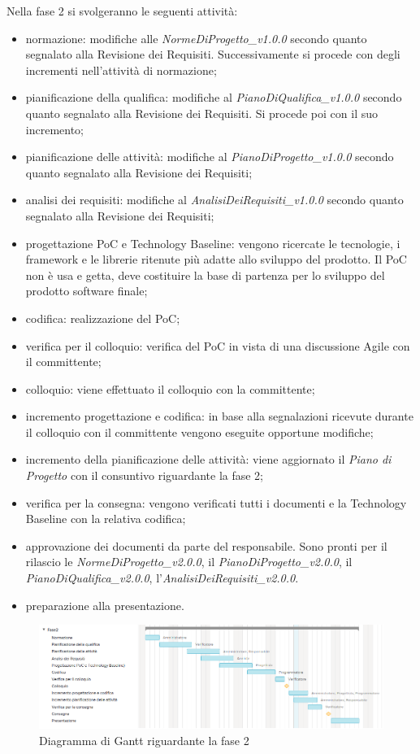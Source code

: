 Nella fase 2 si svolgeranno le seguenti attività:
\begin{itemize}
	\item normazione: modifiche alle \textit{NormeDiProgetto\_v1.0.0} secondo quanto segnalato alla Revisione dei Requisiti. Successivamente si procede con degli incrementi nell'attività di normazione;
	\item pianificazione della qualifica: modifiche al \textit{PianoDiQualifica\_v1.0.0} secondo quanto segnalato alla Revisione dei Requisiti. Si procede poi con il suo incremento;
	\item pianificazione delle attività: modifiche al \textit{PianoDiProgetto\_v1.0.0} secondo quanto segnalato alla Revisione dei Requisiti;
	\item analisi dei requisiti: modifiche al \textit{AnalisiDeiRequisiti\_v1.0.0} secondo quanto segnalato alla Revisione dei Requisiti;
	\item progettazione PoC e Technology Baseline: vengono ricercate le tecnologie, i framework e le librerie ritenute più adatte allo sviluppo del prodotto. Il PoC non è usa e getta, deve costituire la base di partenza per lo sviluppo del prodotto software finale;
	\item codifica: realizzazione del PoC;
	\item verifica per il colloquio: verifica del PoC in vista di una discussione Agile con il committente;
	\item colloquio: viene effettuato il colloquio con la committente;
	\item incremento progettazione e codifica: in base alla segnalazioni ricevute durante il colloquio con il committente vengono eseguite opportune modifiche;
	\item incremento della pianificazione delle attività: viene aggiornato il \textit{Piano di Progetto} con il consuntivo riguardante la fase 2;
	\item verifica per la consegna: vengono verificati tutti i documenti e la Technology Baseline con la relativa codifica;
	\item approvazione dei documenti da parte del responsabile. Sono pronti per il rilascio le \textit{NormeDiProgetto\_v2.0.0}, il \textit{PianoDiProgetto\_v2.0.0}, il \textit{PianoDiQualifica\_v2.0.0}, l'\textit{AnalisiDeiRequisiti\_v2.0.0}.
	\item preparazione alla presentazione.
\end{itemize}

\begin{figure}[h]
	\centering
	\includegraphics[scale=0.67]{images/fase2.png}
	\caption{Diagramma di Gantt riguardante la fase 2}
\end{figure}